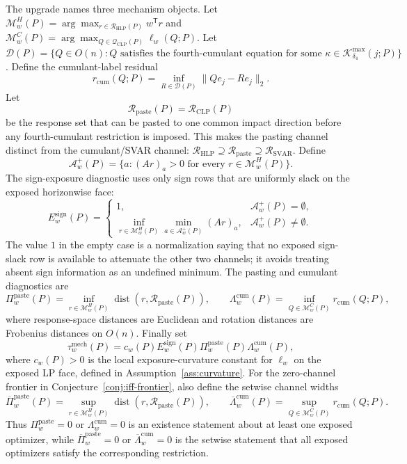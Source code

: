 \documentclass[11pt]{article}
\newcommand{\transpose}{\mathsf{T}}
\theoremstyle{definition}
\theoremstyle{plain}
\theoremstyle{remark}
\begin{document}
The upgrade names three mechanism objects.  Let \(\mathcal M_w^H(P)=\arg\max_{r\in\mathcal R_{\mathrm{HLP}}(P)}w^\transpose r\) and \(\mathcal M_w^C(P)=\arg\max_{Q\in\mathcal Q_{\mathrm{CLP}}(P)}\ell_w(Q;P)\).  Let \(\mathcal D(P)=\{Q\in O(n):Q\text{ satisfies the fourth-cumulant equation for some }\kappa\in\mathcal K_{\delta_4}^{\max}(j;P)\}\).  Define the cumulant-label residual
\[
r_{\mathrm{cum}}(Q;P)=\inf_{R\in\mathcal D(P)}\|Qe_j-Re_j\|_2.
\]
Let
\[
\mathcal R_{\mathrm{paste}}(P)=\mathcal R_{\mathrm{CLP}}(P)
\]
be the response set that can be pasted to one common impact direction before any fourth-cumulant restriction is imposed.  This makes the pasting channel distinct from the cumulant/SVAR channel: \(\mathcal R_{\mathrm{HLP}}\supseteq\mathcal R_{\mathrm{paste}}\supseteq\mathcal R_{\mathrm{SVAR}}\).  Define
\[
\mathcal A_w^+(P)=\{a:(Ar)_a>0\text{ for every }r\in\mathcal M_w^H(P)\}.
\]
The sign-exposure diagnostic uses only sign rows that are uniformly slack on the exposed horizonwise face:
\[
E_w^{\mathrm{sign}}(P)=
\begin{cases}
1, & \mathcal A_w^+(P)=\emptyset,\\
\inf_{r\in\mathcal M_w^H(P)}\min_{a\in\mathcal A_w^+(P)}(Ar)_a, & \mathcal A_w^+(P)\ne\emptyset.
\end{cases}
\]
The value \(1\) in the empty case is a normalization saying that no exposed sign-slack row is available to attenuate the other two channels; it avoids treating absent sign information as an undefined minimum.  The pasting and cumulant diagnostics are
\[
\Pi_w^{\mathrm{paste}}(P)=\inf_{r\in\mathcal M_w^H(P)}\operatorname{dist}(r,\mathcal R_{\mathrm{paste}}(P)),
\qquad
\Lambda_w^{\mathrm{cum}}(P)=\inf_{Q\in\mathcal M_w^C(P)}r_{\mathrm{cum}}(Q;P),
\]
where response-space distances are Euclidean and rotation distances are Frobenius distances on \(O(n)\).  Finally set
\[
\tau_w^{\mathrm{mech}}(P)=c_w(P)E_w^{\mathrm{sign}}(P)\Pi_w^{\mathrm{paste}}(P)\Lambda_w^{\mathrm{cum}}(P),
\]
where \(c_w(P)>0\) is the local exposure-curvature constant for \(\ell_w\) on the exposed LP face, defined in Assumption~\ref{ass:curvature}.
For the zero-channel frontier in Conjecture~\ref{conj:iff-frontier}, also define the setwise channel widths
\[
\overline\Pi_w^{\mathrm{paste}}(P)=\sup_{r\in\mathcal M_w^H(P)}\operatorname{dist}(r,\mathcal R_{\mathrm{paste}}(P)),
\qquad
\overline\Lambda_w^{\mathrm{cum}}(P)=\sup_{Q\in\mathcal M_w^C(P)}r_{\mathrm{cum}}(Q;P).
\]
Thus \(\Pi_w^{\mathrm{paste}}=0\) or \(\Lambda_w^{\mathrm{cum}}=0\) is an existence statement about at least one exposed optimizer, while \(\overline\Pi_w^{\mathrm{paste}}=0\) or \(\overline\Lambda_w^{\mathrm{cum}}=0\) is the setwise statement that all exposed optimizers satisfy the corresponding restriction.
\end{document}
